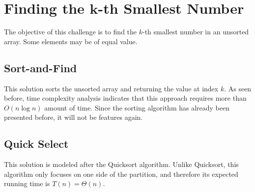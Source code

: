 \chapter{Finding the $\mathbf{k}$-th Smallest Number}
The objective of this challenge is to find the $k$-th smallest number in an
unsorted array. Some elements may be of equal value.

\section{Sort-and-Find}
This solution sorts the unsorted array and returning the value at index $k$. As
seen before, time complexity analysis indicates that this approach requires more
than $O(n\log n)$ amount of time. Since the sorting algorithm has already been
presented before, it will not be features again.

\section{Quick Select}
This solution is modeled after the Quicksort algorithm. Unlike Quicksort, this
algorithm only focuses on one side of the partition, and therefore its expected
running time is $T(n)=\Theta(n)$.
